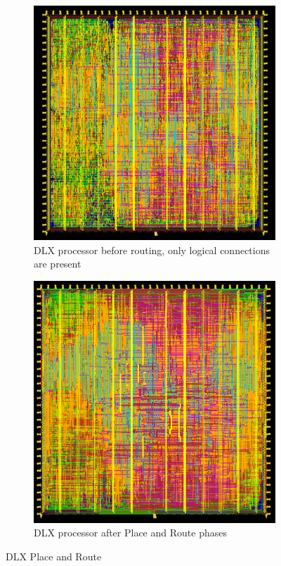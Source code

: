 \begin{figure}[h!]
	\begin{subfigure}[t]{.45\textwidth}
		\centering
		\includegraphics[width=.9\textwidth]{chapters/9_PhysicalDesign/images/pre_routing.png}
		\caption{DLX processor before routing, only logical connections are present}
		\label{fig:pre_routing}
	\end{subfigure}\hfill
	\begin{subfigure}[t]{.45\textwidth}
		\centering
		\includegraphics[width=.9\textwidth]{chapters/9_PhysicalDesign/images/phy_end.png}
		\caption{DLX processor after Place and Route phases}
		\label{fig:phy_end}
	\end{subfigure}
	\caption{DLX Place and Route}
\end{figure}


